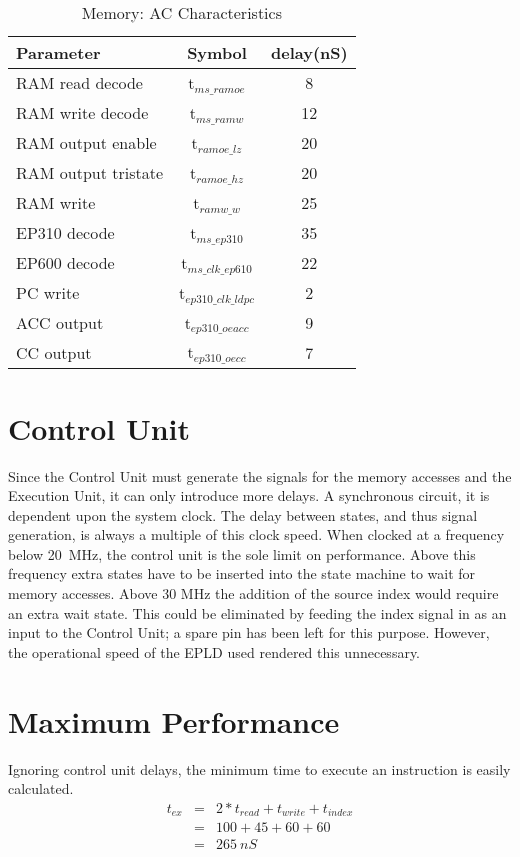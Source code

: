 \begin{table}
\centering
\begin{tabular}{||l|c|c||}
\hline
\hline
Parameter & Symbol & delay(nS)\\
\hline
RAM read decode & t$_{ms\_ramoe}$ & 8\\
RAM write decode & t$_{ms\_ramw}$ & 12\\
RAM output enable & t$_{ramoe\_lz}$ & 20\\
RAM output tristate & t$_{ramoe\_hz}$ & 20\\
RAM write  & t$_{ramw\_w}$ & 25\\
\hline
EP310 decode & t$_{ms\_ep310}$ & 35\\
EP600 decode & t$_{ms\_clk\_ep610}$ & 22\\
PC write  & t$_{ep310\_clk\_ldpc} $ & 2\\
ACC output & t$_{ep310\_oeacc}$ & 9\\
CC output & t$_{ep310\_oecc} $ & 7 \\
\hline
\hline
\end{tabular}
\caption{Memory: AC Characteristics}
\label{table:memory timing}
\end{table}

\section{Control Unit}
Since the Control Unit must generate the signals for the memory accesses and the Execution Unit, it  can only introduce more delays.
A synchronous circuit, it is dependent upon the system clock.
The delay between states, and thus signal generation, is always a multiple of this clock speed.
When clocked at a frequency below  20~MHz, the control unit is the sole limit on performance.
Above this frequency extra  states have to be inserted into the state machine to wait for memory accesses.
Above 30 MHz the addition of the source index would require an extra wait state. This could  be eliminated by feeding the index signal in as an input to the Control Unit; a spare pin has been left for this purpose.
However, the operational speed of the EPLD used rendered this unnecessary.

\section{Maximum Performance}

Ignoring control unit delays, the minimum time to execute an instruction is 
easily calculated. 
\begin{eqnarray}
t_{ex} & = & 2*t_{read}+t_{write}+t_{index}\\
& = & 100+45+60+60 \nonumber\\
& = & 265~nS \nonumber\\
\end{eqnarray}

